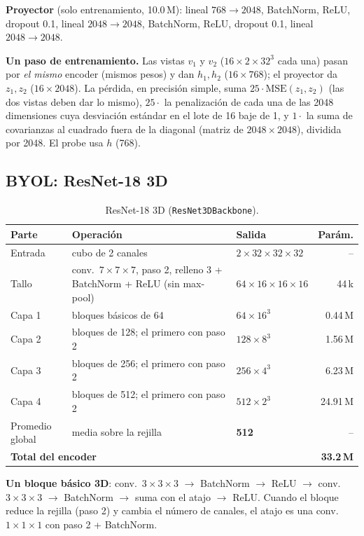 \documentclass[11pt,a4paper]{article}
\begin{document}
\textbf{Proyector} (solo entrenamiento, 10.0\,M): lineal $768\rightarrow2048$, BatchNorm, ReLU,
dropout 0.1, lineal $2048\rightarrow2048$, BatchNorm, ReLU, dropout 0.1, lineal
$2048\rightarrow2048$.

\textbf{Un paso de entrenamiento.} Las vistas $v_1$ y $v_2$ ($16\times2\times32^3$ cada una) pasan
por \emph{el mismo} encoder (mismos pesos) y dan $h_1,h_2$ ($16\times768$); el proyector da
$z_1,z_2$ ($16\times2048$). La pérdida, en precisión simple, suma
$25\cdot\mathrm{MSE}(z_1,z_2)$ (las dos vistas deben dar lo mismo), $25\cdot$ la penalización de
cada una de las 2048 dimensiones cuya desviación estándar en el lote de 16 baje de 1, y $1\cdot$ la
suma de covarianzas al cuadrado fuera de la diagonal (matriz de $2048\times2048$), dividida por 2048.
El probe usa $h$ (768).

\subsection{BYOL: ResNet-18 3D}
\label{sec:resnet}

\begin{table}[H]
\centering
\small
\begin{tabularx}{\textwidth}{l>{\raggedright\arraybackslash}Xlr}
\toprule
Parte & Operación & Salida & Parám. \\
\midrule
Entrada & cubo de 2 canales & $2\times32\times32\times32$ & -- \\
Tallo & conv.\ $7\times7\times7$, paso 2, relleno 3 + BatchNorm + ReLU (sin max-pool) & $64\times16\times16\times16$ & 44\,k \\
Capa 1 & 2 bloques básicos de 64 & $64\times16^3$ & 0.44\,M \\
Capa 2 & 2 bloques de 128; el primero con paso 2 & $128\times8^3$ & 1.56\,M \\
Capa 3 & 2 bloques de 256; el primero con paso 2 & $256\times4^3$ & 6.23\,M \\
Capa 4 & 2 bloques de 512; el primero con paso 2 & $512\times2^3$ & 24.91\,M \\
Promedio global & media sobre la rejilla & \textbf{512} & -- \\
\midrule
\multicolumn{3}{l}{\textbf{Total del encoder}} & \textbf{33.2\,M} \\
\bottomrule
\end{tabularx}
\caption{ResNet-18 3D (\texttt{ResNet3DBackbone}).}
\end{table}

\textbf{Un bloque básico 3D}: conv.\ $3\times3\times3$ $\rightarrow$ BatchNorm $\rightarrow$ ReLU
$\rightarrow$ conv.\ $3\times3\times3$ $\rightarrow$ BatchNorm $\rightarrow$ suma con el atajo
$\rightarrow$ ReLU. Cuando el bloque reduce la rejilla (paso 2) y cambia el número de canales, el
atajo es una conv.\ $1\times1\times1$ con paso 2 + BatchNorm.
\end{document}
